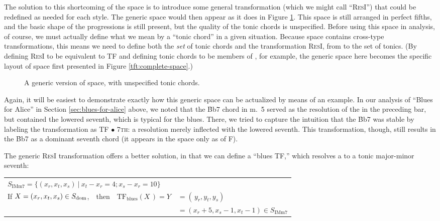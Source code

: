 The solution to this shortcoming of the space is to introduce some general
transformation (which we might call ``\textsc{ResI}'') that could be redefined
as needed for each style. The generic space would then appear as it
does in Figure \ref{tfe:generic-space}. This space is still arranged in
perfect fifths, and the basic shape of the \tfo progressions is still present,
but the quality of the tonic chords is unspecified. Before using this space in
analysis, of course, we must actually define what we mean by a ``tonic chord''
in a given situation. Because \tf space contains cross-type transformations,
this means we need to define both the \emph{set} of tonic chords and the
transformation \textsc{ResI}, from \Sdom to the set of tonics. (By defining
\textsc{ResI} to be equivalent to TF and defining tonic chords to be members
of \Smaj, for example, the generic space here becomes the specific layout of
\tf space first presented in Figure \ref{tft:complete-space}.)

\begin{figure}[tbp]
  \caption{A generic version of \tf space, with unspecified tonic chords.}
  \label{tfe:generic-space}
\end{figure}

Again, it will be easiest to demonstrate exactly how this generic space can be
actualized by means of an example. In our analysis of ``Blues for Alice'' in
Section \ref{sec:blues-for-alice} above, we noted that the \h{Bb7} chord in
m.~5 served as the resolution of the \tf in the preceding bar, but contained
the lowered seventh, which is typical for the blues. There, we tried to
capture the intuition that the \h{Bb7} was stable by labeling the
transformation as TF $\bullet$ \textsc{7th}: a resolution merely inflected with
the lowered seventh. This transformation, though, still results in the \h{Bb7}
as a dominant seventh chord (it appears in the space only as \V of F).

The generic \textsc{ResI} transformation offers a better solution, in that we
can define a ``blues TF,'' which resolves a \V to a tonic major-minor
seventh: \\
%
\vspace{0.5\baselineskip}
\addtolength{\tabcolsep}{-4pt}
\begin{tabular}{lcll}
  \multicolumn{3}{l}{$S_{\mathrm{IMm7}} = \{ (x_r, x_t, x_s)\ |\ x_t - x_r = 4; x_s - x_r = 10 \}$} \\
  If $X = (x_r, x_t, x_s) \in S_{\mathrm{dom}}$, & \hspace{3pt} then \hspace{3pt}&
    $\mathrm{TF}_\mathrm{blues}(X\,) = Y$ &$= (\,y_r, y_t, y_s) $ \\
                                        &&&$= (x_r + 5, x_s - 1,
                                               x_t - 1) \in S_{\mathrm{IMm7}}$
\end{tabular}
\addtolength{\tabcolsep}{4pt}
\vspace{0.5\baselineskip}

